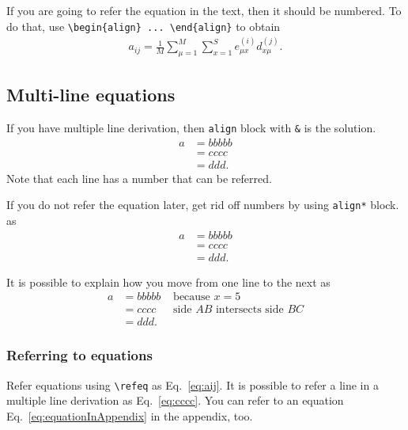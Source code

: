 \documentclass[10pt,journal,compsoc]{IEEEtran}
\newcommand{\refeq}[1]{Eq.~\ref{#1}}
\newcommand{\hCode}[1]{\texttt{#1}}
\theoremstyle{plain}
\theoremstyle{definition}
\theoremstyle{remark}
\begin{document}
If you are going to refer the equation in the text,
then it should be numbered.
To do that,
use \verb!\begin{align} ... \end{align}! to obtain
\begin{align}
	a_{ij} =
		\frac{1}{M}
		\sum_{\mu = 1}^{M} 
		{\sum_{x = 1}^{S} 
			e_{\mu x}^{(i)}
			d_{x \mu}^{(j)} }.
	\label{eq:aij}
\end{align}




\subsection{Multi-line equations}

If you have multiple line derivation,
then \hCode{align} block with \verb!&! is the solution.
\begin{align}
	a 
	&= bbbbb\\
	&= cccc \label{eq:cccc}\\
	&= ddd.
\end{align}
Note that each line has a number that can be referred.

If you do not refer the equation later,
get rid off numbers by using \hCode{align*} block.
as
\begin{align*}
	a 
	&= bbbbb\\
	&= cccc\\
	&= ddd.
\end{align*}

It is possible to explain how you move from one line to the next as 
\begin{align*}
	a 
	&= bbbbb
		&\text{ because } x = 5\\
	&= cccc
		&\text{ side $AB$ intersects side $BC$}\\
	&= ddd.
\end{align*}




\subsubsection{Referring to equations}

Refer equations using \verb!\refeq! as \refeq{eq:aij}.
It is possible to refer a line in a multiple line derivation as \refeq{eq:cccc}.
You can refer to an equation \refeq{eq:equationInAppendix} in the appendix, too.
\end{document}
